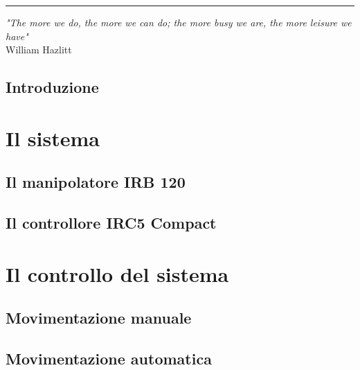 \documentclass [11 pt, a4 paper, twoside, openright]{book}
\newcommand {\fncymain}{%
	\fancyhead [LO]{{\footnotesize \MakeUppercase	\rightmark }}
	\fancyfoot [LO]{\thepage }
	\fancyhead [RE]{{\footnotesize \MakeUppercase	\leftmark }}
	\fancyfoot [RE]{\thepage }
	\renewcommand {\footrulewidth}{0.3 pt}}
\begin{document}
	\rule[-1pt]{5cm}{0.4pt} %
	\frontmatter
	\thispagestyle{empty}
	\begin {flushright}
		\null {}
			\emph{"The more we do, the more we can do; the more busy we are, the more leisure we have"}\\William Hazlitt
		\null
	\end {flushright}
	\tableofcontents
	\listoffigures
	\lstlistoflistings
	\fncymain 
	\mainmatter
	\chapter{Introduzione}
	
	\label{chapter:introduction}
	\part{Il sistema}
	\label{part:Il_sistema}
	\chapter{Il manipolatore IRB 120}
	
	\chapter{Il controllore IRC5 Compact}
	\label{chapter:IRC5}
	
	
	\part{Il controllo del sistema}
	\label{part:Il_controllo}
	\chapter{Movimentazione manuale}
	
	\label{chapter:FlexPendant}
	\chapter{Movimentazione automatica}
	
\end{document}
